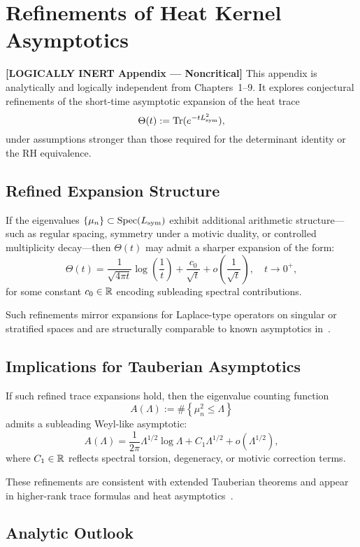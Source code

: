 \section{Refinements of Heat Kernel Asymptotics}
\label{app:heat_kernel_refinements}

\noindent\textbf{[LOGICALLY INERT Appendix — Noncritical]}  
This appendix is analytically and logically independent from Chapters~1–9. It explores conjectural refinements of the short-time asymptotic expansion of the heat trace
\[
\Theta(t) := \operatorname{Tr}(e^{-t L_{\mathrm{sym}}^2}),
\]
under assumptions stronger than those required for the determinant identity or the RH equivalence.

\subsection*{Refined Expansion Structure}

If the eigenvalues \( \{\mu_n\} \subset \operatorname{Spec}(L_{\mathrm{sym}}) \) exhibit additional arithmetic structure—such as regular spacing, symmetry under a motivic duality, or controlled multiplicity decay—then \( \Theta(t) \) may admit a sharper expansion of the form:
\[
\Theta(t) = \frac{1}{\sqrt{4\pi t}} \log\left( \frac{1}{t} \right)
+ \frac{c_0}{\sqrt{t}} + o\left( \frac{1}{\sqrt{t}} \right),
\quad t \to 0^+,
\]
for some constant \( c_0 \in \mathbb{R} \) encoding subleading spectral contributions.

Such refinements mirror expansions for Laplace-type operators on singular or stratified spaces and are structurally comparable to known asymptotics in~\cite{Seeley1967ComplexPowers, Gilkey1995Invariance, Vaillant2001HeatKernel}.

\subsection*{Implications for Tauberian Asymptotics}

If such refined trace expansions hold, then the eigenvalue counting function
\[
A(\Lambda) := \#\left\{ \mu_n^2 \le \Lambda \right\}
\]
admits a subleading Weyl-like asymptotic:
\[
A(\Lambda) = \frac{1}{2\pi} \Lambda^{1/2} \log \Lambda
+ C_1 \Lambda^{1/2} + o(\Lambda^{1/2}),
\]
where \( C_1 \in \mathbb{R} \) reflects spectral torsion, degeneracy, or motivic correction terms.

These refinements are consistent with extended Tauberian theorems and appear in higher-rank trace formulas and heat asymptotics~\cite{Korevaar2004Tauberian}.

\subsection*{Analytic Outlook}

